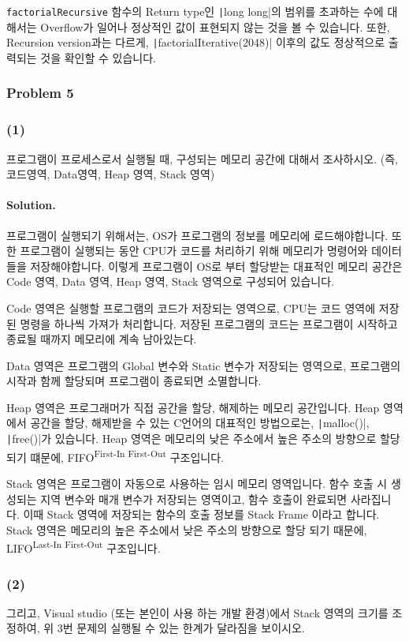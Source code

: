 \texttt{factorialRecursive} 함수의 Return type인 \texttt|long long|의 범위를 초과하는 수에 대해서는 Overflow가 일어나 정상적인 값이 표현되지 않는 것을 볼 수 있습니다.
또한, Recursion version과는 다르게, \texttt|factorialIterative(2048)| 이후의 값도 정상적으로 출력되는 것을 확인할 수 있습니다.
\subsubsection{Problem 5}
\subsubsection{(1)}
프로그램이 프로세스로서 실행될 때, 구성되는 메모리 공간에 대해서 조사하시오.
(즉, 코드영역, Data영역, Heap 영역, Stack 영역)

\paragraph{Solution.}
프로그램이 실행되기 위해서는, OS가 프로그램의 정보를 메모리에 로드해야합니다.
또한 프로그램이 실행되는 동안 CPU가 코드를 처리하기 위해 메모리가 명령어와 데이터들을 저장해야합니다.
이렇게 프로그램이 OS로 부터 할당받는 대표적인 메모리 공간은 Code 영역, Data 영역, Heap 영역, Stack 영역으로 구성되어 있습니다.

Code 영역은 실행할 프로그램의 코드가 저장되는 영역으로,
CPU는 코드 영역에 저장된 명령을 하나씩 가져가 처리합니다.
저장된 프로그램의 코드는 프로그램이 시작하고 종료될 때까지 메모리에 계속 남아있는다.

Data 영역은 프로그램의 Global 변수와 Static 변수가 저장되는 영역으로,
프로그램의 시작과 함께 할당되며 프로그램이 종료되면 소멸합니다.

Heap 영역은 프로그래머가 직접 공간을 할당, 해제하는 메모리 공간입니다.
Heap 영역에서 공간을 할당, 해제받을 수 있는 C언어의 대표적인 방법으로는, \texttt|malloc()|, \texttt|free()|가 있습니다.
Heap 영역은 메모리의 낮은 주소에서 높은 주소의 방향으로 할당되기 떄문에, FIFO\textsuperscript{First-In First-Out} 구조입니다.

Stack 영역은 프로그램이 자동으로 사용하는 임시 메모리 영역입니다.
함수 호출 시 생성되는 지역 변수와 매개 변수가 저장되는 영역이고, 함수 호출이 완료되면 사라집니다.
이때 Stack 영역에 저장되는 함수의 호출 정보를 Stack Frame 이라고 합니다.
Stack 영역은 메모리의 높은 주소에서 낮은 주소의 방향으로 할당 되기 때문에, LIFO\textsuperscript{Last-In First-Out} 구조입니다.
\newpage
\subsubsection{(2)}
그리고, Visual studio (또는 본인이 사용 하는 개발 환경)에서 Stack 영역의 크기를 조정하여,
위 3번 문제의 실행될 수 있는 한계가 달라짐을 보이시오.

